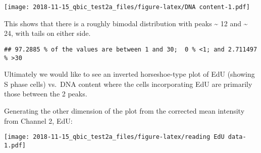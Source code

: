\documentclass[]{article}
\newenvironment{Shaded}{\begin{snugshade}}{\end{snugshade}}
\newcommand{\KeywordTok}[1]{\textcolor[rgb]{0.13,0.29,0.53}{\textbf{#1}}}
\newcommand{\DecValTok}[1]{\textcolor[rgb]{0.00,0.00,0.81}{#1}}
\newcommand{\StringTok}[1]{\textcolor[rgb]{0.31,0.60,0.02}{#1}}
\newcommand{\CommentTok}[1]{\textcolor[rgb]{0.56,0.35,0.01}{\textit{#1}}}
\newcommand{\OperatorTok}[1]{\textcolor[rgb]{0.81,0.36,0.00}{\textbf{#1}}}
\newcommand{\NormalTok}[1]{#1}
\begin{document}
\texttt{[image: 2018-11-15\_qbic\_test2a\_files/figure-latex/DNA content-1.pdf]}

This shows that there is a roughly bimodal distribution with peaks
\textasciitilde{} 12 and \textasciitilde{} 24, with tails on either
side.

\begin{Shaded}
\end{Shaded}

\begin{verbatim}
## 97.2885 % of the values are between 1 and 30;  0 % <1; and 2.711497 % >30
\end{verbatim}

Ultimately we would like to see an inverted horseshoe-type plot of EdU
(showing S phase cells) vs.~DNA content where the cells incorporating
EdU are primarily those between the 2 peaks.

Generating the other dimension of the plot from the corrected mean
intensity from Channel 2, EdU:

\begin{Shaded}
\end{Shaded}

\texttt{[image: 2018-11-15\_qbic\_test2a\_files/figure-latex/reading EdU data-1.pdf]}
\end{document}
